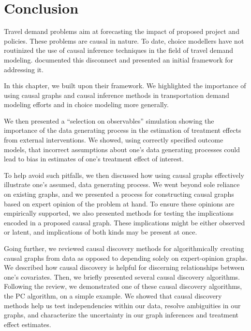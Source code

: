 \section{Conclusion}
\label{sec:conclusion}

Travel demand problems aim at forecasting the impact of proposed project and policies.
These problems are causal in nature.
To date, choice modellers have not routinized the use of causal inference techniques in the field of travel demand modeling.
\citet{brathwaite_2018_causal} documented this disconnect and presented an initial framework for addressing it.

In this chapter, we built upon their framework.
We highlighted the importance of using causal graphs and causal inference methods in transportation demand modeling efforts and in choice modeling more generally.

We then presented a ``selection on observables'' simulation showing the importance of the data generating process in the estimation of treatment effects from external interventions.
We showed, using correctly specified outcome models, that incorrect assumptions about one's data generating processes could lead to bias in estimates of one's treatment effect of interest.

To help avoid such pitfalls, we then discussed how using causal graphs effectively illustrate one's assumed, data generating process.
We went beyond sole reliance on existing graphs, and we presented a process for constructing causal graphs based on expert opinion of the problem at hand.
To ensure these opinions are empirically supported, we also presented methods for testing the implications encoded in a proposed causal graph.
These implications might be either observed or latent, and implications of both kinds may be present at once.

Going further, we reviewed causal discovery methods for algorithmically creating causal graphs from data as opposed to depending solely on expert-opinion graphs.
We described how causal discovery is helpful for discerning relationships between one's covariates.
Then, we briefly presented several causal discovery algorithms.
Following the review, we demonstrated one of these causal discovery algorithms, the PC algorithm, on a simple example.
We showed that causal discovery methods help us test independencies within our data,
resolve ambiguities in our graphs,
and characterize the uncertainty in our graph inferences and treatment effect estimates.

